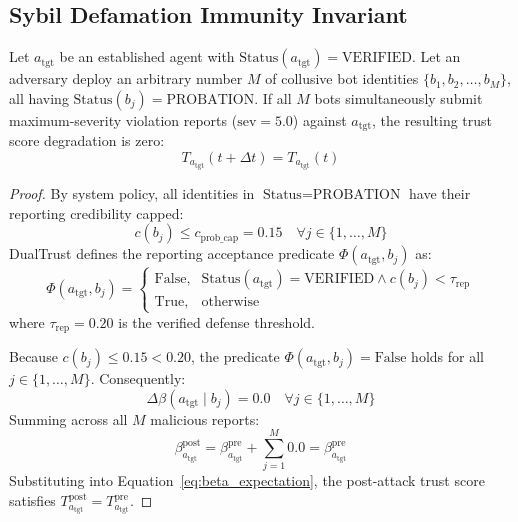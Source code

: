 \documentclass[manuscript, screen, review]{jair}
\begin{document}
\subsection{Sybil Defamation Immunity Invariant}
\label{sec:sybil}

\begin{proposition}
\label{prop:sybil}
\label{thm:sybil}
Let $a_{\text{tgt}}$ be an established agent with $\text{Status}(a_{\text{tgt}}) = \text{VERIFIED}$. Let an adversary deploy an arbitrary number $M$ of collusive bot identities $\{b_1, b_2, \dots, b_M\}$, all having $\text{Status}(b_j) = \text{PROBATION}$. If all $M$ bots simultaneously submit maximum-severity violation reports ($\text{sev} = 5.0$) against $a_{\text{tgt}}$, the resulting trust score degradation is zero:
\begin{equation}
T_{a_{\text{tgt}}}(t + \Delta t) = T_{a_{\text{tgt}}}(t)
\end{equation}
\end{proposition}

\begin{proof}
By system policy, all identities in $\text{Status} = \text{PROBATION}$ have their reporting credibility capped:
\begin{equation}
c(b_j) \le c_{\text{prob\_cap}} = 0.15 \quad \forall j \in \{1, \dots, M\}
\end{equation}
DualTrust defines the reporting acceptance predicate $\Phi(a_{\text{tgt}}, b_j)$ as:
\begin{equation}
\Phi(a_{\text{tgt}}, b_j) =
\begin{cases}
\text{False}, & \text{Status}(a_{\text{tgt}}) = \text{VERIFIED} \land c(b_j) < \tau_{\text{rep}} \\
\text{True}, & \text{otherwise}
\end{cases}
\end{equation}
where $\tau_{\text{rep}} = 0.20$ is the verified defense threshold.

Because $c(b_j) \le 0.15 < 0.20$, the predicate $\Phi(a_{\text{tgt}}, b_j) = \text{False}$ holds for all $j \in \{1, \dots, M\}$. Consequently:
\begin{equation}
\Delta\beta(a_{\text{tgt}} \mid b_j) = 0.0 \quad \forall j \in \{1, \dots, M\}
\end{equation}
Summing across all $M$ malicious reports:
\begin{equation}
\beta_{a_{\text{tgt}}}^{\text{post}} = \beta_{a_{\text{tgt}}}^{\text{pre}} + \sum_{j=1}^{M} 0.0 = \beta_{a_{\text{tgt}}}^{\text{pre}}
\end{equation}
Substituting into Equation~\eqref{eq:beta_expectation}, the post-attack trust score satisfies $T_{a_{\text{tgt}}}^{\text{post}} = T_{a_{\text{tgt}}}^{\text{pre}}$.
\end{proof}
\end{document}
